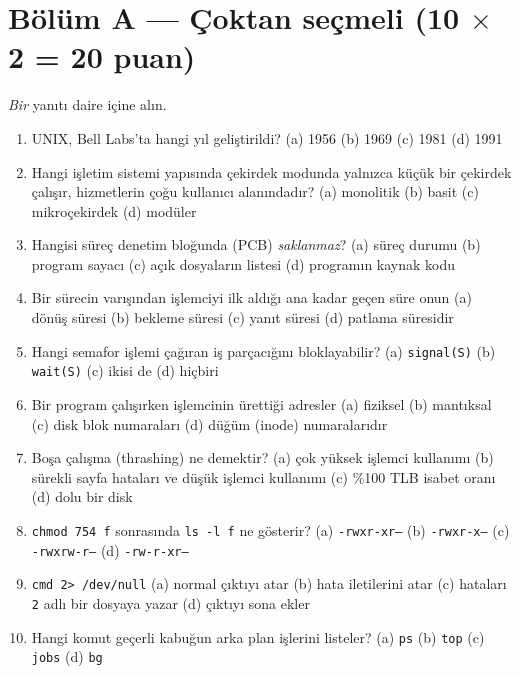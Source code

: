 \documentclass[11pt,a4paper]{article}
\begin{document}
\section*{Bölüm A --- Çoktan seçmeli \hfill (10 $\times$ 2 = 20 puan)}
\emph{Bir} yanıtı daire içine alın.
\begin{enumerate}[leftmargin=1.8em,label=A\arabic*.,itemsep=0.35em]
  \item UNIX, Bell Labs'ta hangi yıl geliştirildi? \quad (a) 1956 \quad (b) 1969 \quad (c) 1981 \quad (d) 1991
  \item Hangi işletim sistemi yapısında çekirdek modunda yalnızca küçük bir çekirdek çalışır, hizmetlerin çoğu kullanıcı alanındadır? \quad (a) monolitik \quad (b) basit \quad (c) mikroçekirdek \quad (d) modüler
  \item Hangisi süreç denetim bloğunda (PCB) \emph{saklanmaz}? \quad (a) süreç durumu \quad (b) program sayacı \quad (c) açık dosyaların listesi \quad (d) programın kaynak kodu
  \item Bir sürecin varışından işlemciyi ilk aldığı ana kadar geçen süre onun \quad (a) dönüş süresi \quad (b) bekleme süresi \quad (c) yanıt süresi \quad (d) patlama süresidir
  \item Hangi semafor işlemi çağıran iş parçacığını bloklayabilir? \quad (a) \texttt{signal(S)} \quad (b) \texttt{wait(S)} \quad (c) ikisi de \quad (d) hiçbiri
  \item Bir program çalışırken işlemcinin ürettiği adresler \quad (a) fiziksel \quad (b) mantıksal \quad (c) disk blok numaraları \quad (d) düğüm (inode) numaralarıdır
  \item Boşa çalışma (thrashing) ne demektir? \quad (a) çok yüksek işlemci kullanımı \quad (b) sürekli sayfa hataları ve düşük işlemci kullanımı \quad (c) \%100 TLB isabet oranı \quad (d) dolu bir disk
  \item \texttt{chmod 754 f} sonrasında \texttt{ls -l f} ne gösterir? \quad (a) \texttt{-rwxr-xr--} \quad (b) \texttt{-rwxr-x---} \quad (c) \texttt{-rwxrw-r--} \quad (d) \texttt{-rw-r-xr--}
  \item \texttt{cmd 2> /dev/null} \quad (a) normal çıktıyı atar \quad (b) hata iletilerini atar \quad (c) hataları \texttt{2} adlı bir dosyaya yazar \quad (d) çıktıyı sona ekler
  \item Hangi komut geçerli kabuğun arka plan işlerini listeler? \quad (a) \texttt{ps} \quad (b) \texttt{top} \quad (c) \texttt{jobs} \quad (d) \texttt{bg}
\end{enumerate}
\end{document}
